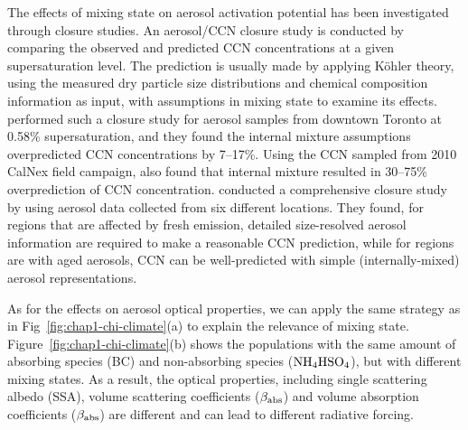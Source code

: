 \documentclass[edeposit,fullpage]{uiucthesis2009}
\begin{document}
The effects of mixing state on aerosol activation potential has been
investigated through closure studies. An aerosol/CCN closure study is
conducted by comparing the observed and predicted CCN concentrations
at a given supersaturation level. The prediction is usually made by
applying K\"ohler theory, using the measured dry particle size
distributions and chemical composition information as input, with
assumptions in mixing state to examine its effects.
\citet{broekhuizen2006closure} performed such a closure study for
aerosol samples from downtown Toronto at 0.58\% supersaturation, and
they found the internal mixture assumptions overpredicted CCN
concentrations by 7--17\%. Using the CCN sampled from 2010 CalNex
field campaign, \citet{moore2012hygroscopicity} also found that
internal mixture resulted in 30--75\% overprediction of CCN
concentration. \citet{ervens2010ccn} conducted a comprehensive closure
study by using aerosol data collected from six different
locations. They found, for regions that are affected by fresh
emission, detailed size-resolved aerosol information are required to
make a reasonable CCN prediction, while for regions are with aged
aerosols, CCN can be well-predicted with simple (internally-mixed)
aerosol representations.

As for the effects on aerosol optical properties, we can apply the
same strategy as in Fig~\ref{fig:chap1-chi-climate}(a) to explain the
relevance of mixing state. Figure~\ref{fig:chap1-chi-climate}(b) shows
the populations with the same amount of absorbing species (BC) and
non-absorbing species ($\rm NH_4HSO_4$), but with different mixing
states. As a result, the optical properties, including single
scattering albedo (SSA), volume scattering coefficients ($\beta_{\rm
  abs}$) and volume absorption coefficients ($\beta_{\rm abs}$) are
different and can lead to different radiative forcing.
\end{document}
